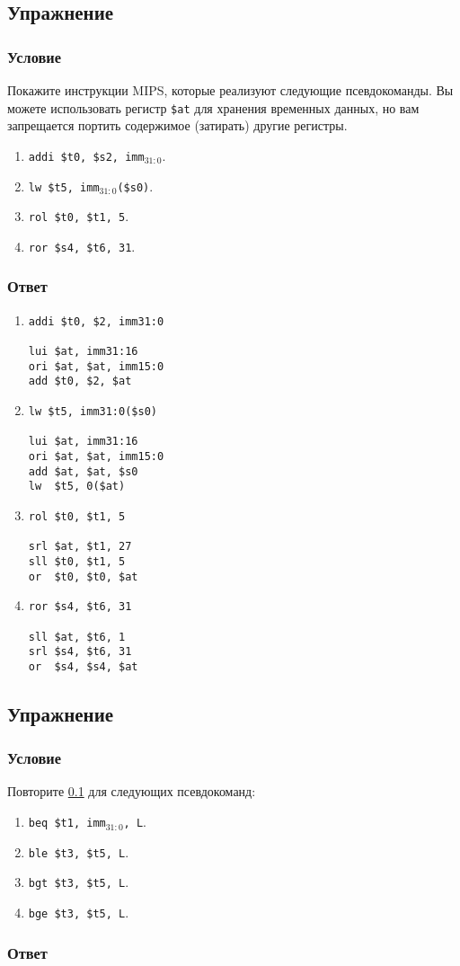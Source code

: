 \documentclass[12pt]{article}
\newenvironment{e}[1][dummy label]{
    \subsection{Упражнение}\label{#1}
    \subsubsection*{Условие}
    }{
    \subsubsection*{Ответ}
}
\newcommand{\eref}[1]{\hyperref[{e:#1}]{\nameref*{e:#1} \ref*{e:#1}}}
\begin{document}
\begin{e}[e:pseudo]
Покажите инструкции MIPS, которые реализуют следующие псевдокоманды. Вы можете использовать регистр \texttt{\$at} для хранения временных данных, но вам запрещается портить содержимое (затирать) другие регистры.

\begin{enumerate}
\item \texttt{addi \$t0, \$s2, imm}$_{31:0}$.
\item \texttt{lw \$t5, imm$_{31:0}$(\$s0)}.
\item \texttt{rol \$t0, \$t1, 5}.
\item \texttt{ror \$s4, \$t6, 31}.
\end{enumerate}
\end{e}

\begin{enumerate}
\item
\begin{verbatim}
addi $t0, $2, imm31:0

lui $at, imm31:16
ori $at, $at, imm15:0
add $t0, $2, $at
\end{verbatim}

\item
\begin{verbatim}
lw $t5, imm31:0($s0)

lui $at, imm31:16
ori $at, $at, imm15:0
add $at, $at, $s0
lw  $t5, 0($at)
\end{verbatim}

\item
\begin{verbatim}
rol $t0, $t1, 5

srl $at, $t1, 27
sll $t0, $t1, 5
or  $t0, $t0, $at
\end{verbatim}

\item
\begin{verbatim}
ror $s4, $t6, 31

sll $at, $t6, 1
srl $s4, $t6, 31
or  $s4, $s4, $at
\end{verbatim}

\end{enumerate}

\newpage

\begin{e}
Повторите \eref{pseudo} для следующих псевдокоманд:

\begin{enumerate}
\item \texttt{beq  \$t1, imm$_{31:0}$, L}.
\item \texttt{ble  \$t3, \$t5, L}.
\item \texttt{bgt  \$t3, \$t5, L}.
\item \texttt{bge  \$t3, \$t5, L}.
\end{enumerate}
\end{e}
\end{document}
